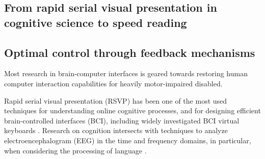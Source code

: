 \subsection{From rapid serial visual presentation in cognitive science to speed reading}

\subsection{Optimal control through feedback mechanisms}





Most research in brain-computer interfaces is geared towards restoring human computer interaction capabilities for heavily motor-impaired disabled.


\label{related_work}
Rapid serial visual presentation (RSVP) has been one of the most used techniques for understanding online cognitive processes, and for designing efficient brain-controlled interfaces (BCI), including widely investigated BCI virtual keyboards \cite{}. Research on cognition intersects with techniques to analyze electroencephalogram (EEG) in the time and frequency domains, in particular, when considering the processing of language \cite{}. 

